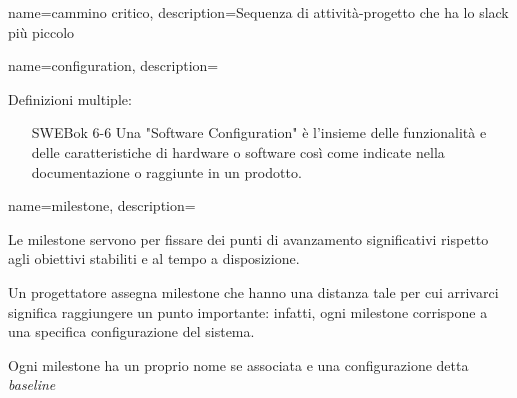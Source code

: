 {
name=cammino critico,
description={Sequenza di attivit\`a-progetto che ha lo slack pi\`u piccolo}
}

{
name=configuration,
description={Definizioni multiple:
\begin{enumerate}
\itemLa configuration si basa sul concetto di sistema e la si ha dall'inizio di uno sviluppo (conception) fino alla fine (uso operativo) Ogni pezzo del sistema ha il suo perch\`e e della conception fino all'uso operativo ha diverse configuration. Si hanno tante configuration  potenzialmente in base alle configurazioni che si avranno, e si deve decidere quando averranno i cambiamento di scarsa o molta importanza. Questa decisione avviene attraverso le milestone.
\item [SWEBok 6-6] Una "Software Configuration" è l'insieme delle funzionalità e delle caratteristiche di hardware o software così come indicate nella documentazione o raggiunte in un prodotto.
\end{enumerate}
}
}




{
name=milestone,
description={Le milestone servono per fissare dei punti di avanzamento significativi rispetto agli obiettivi stabiliti e al tempo a disposizione.

Un progettatore assegna milestone che hanno una distanza tale per cui arrivarci significa raggiungere un punto importante: infatti, ogni milestone corrispone a una specifica configurazione del sistema.

Ogni milestone ha un proprio nome se associata e una configurazione detta \textit{baseline}}
}

